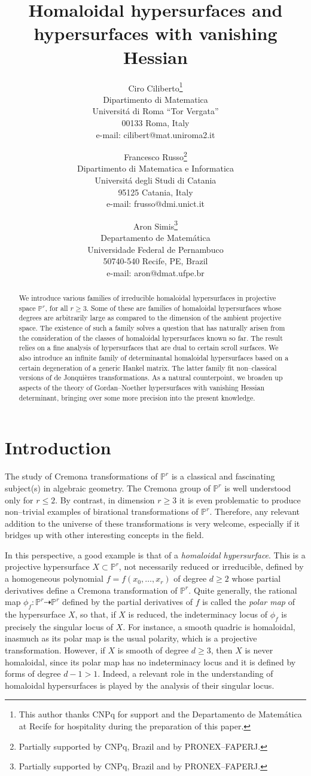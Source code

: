 \documentclass[11pt]{article}   %
\title{\LARGE\sc  Homaloidal hypersurfaces and hypersurfaces with vanishing
Hessian}
\author{
{\normalsize\sc Ciro Ciliberto\thanks{This author thanks CNPq for support and the
Departamento de Matem\'atica at Recife for hospitality during the
preparation of this paper.}}
\vspace{-0.75mm}\\
{\small Dipartimento di Matematica}\vspace{-1.4mm} \\
{\small Universit\'a di Roma ``Tor Vergata''}\vspace{-1.4mm}\\
{\small 00133 Roma, Italy}\vspace{-1.4mm} \\
{\small e-mail: {cilibert@mat.uniroma2.it}} \\
\and {\normalsize\sc Francesco Russo\thanks{Partially
 supported by CNPq, Brazil and by PRONEX--FAPERJ.}}
\vspace{-0.75mm}\\
{\small Dipartimento di Matematica e Informatica}\vspace{-1.4mm} \\
{\small Universit\'a degli Studi di Catania}\vspace{-1.4mm}\\
{\small 95125 Catania, Italy}\vspace{-1.4mm} \\
{\small e-mail: {frusso@dmi.unict.it}}\\
 \and {\normalsize\sc Aron Simis\thanks {Partially supported by CNPq, Brazil and by PRONEX--FAPERJ.}}
\vspace{-0.75mm}\\
{\small Departamento de Matem\'atica}\vspace{-1.4mm} \\
{\small Universidade Federal de Pernambuco}\vspace{-1.4mm}\\
{\small 50740-540 Recife, PE, Brazil}\vspace{-1.4mm} \\
{\small e-mail: {aron@dmat.ufpe.br}} }
\theoremstyle{definition}
\numberwithin{Theorem}{section} \numberwithin{equation}{section}
\newcommand{\p}{{\mathbb P}}
\begin{document}
\date{}
\maketitle


\begin{abstract}

We {introduce} various families of
irreducible homaloidal hypersurfaces in projective space $\p^ r$,
for all $r\geq 3$. Some of these are families of homaloidal
hypersurfaces whose degrees are arbitrarily large as compared to the
dimension of the ambient projective space. The existence of such a
family solves a question that has naturally arisen from the
consideration of the classes of homaloidal hypersurfaces known so
far. The result relies on a fine analysis
of hypersurfaces {that are dual} to certain scroll
surfaces. We also introduce an infinite family of determinantal
homaloidal hypersurfaces based   on a
certain degeneration of a generic Hankel matrix. {The latter
family} fit non--classical versions of de
Jonqui\`eres transformations. As a natural counterpoint, we broaden
up aspects of the theory of Gordan--Noether hypersurfaces with
vanishing Hessian determinant, bringing
over some more precision into the present knowledge.


\end{abstract}


\section*{Introduction}\label {intro}

The study of Cremona  transformations of
$\p^ r$ is {a}  classical and fascinating
subject(s) in algebraic geometry. The Cremona group of $\p^ r$ is
well understood only for $r\leq 2$. By contrast, in dimension $r\geq
3$ it is even problematic to produce non--trivial examples of
birational transformations of $\p^ r$.
Therefore, {any relevant addition to the universe of these
transformations} is very welcome, especially if it bridges {up}
with other interesting concepts in the field.

In this perspective, {a good example}
 is {that of a}
\emph{homaloidal hypersurface}. This is a projective hypersurface
$X\subset \p^r$, not necessarily reduced or irreducible,
defined by a homogeneous {polynomial
$f=f(x_0,\dots,x_r)$ of degree ${d\geq 2}$ whose}
partial derivatives define a Cremona
transformation of $\p^r$. {Quite
generally}, the rational map
$\phi_f:\p^r\dasharrow \p^r$ defined by the partial derivatives of
$f$ is called the \emph {polar map}  of the hypersurface $X$, so
that, if  $X$ is reduced, the indeterminacy locus of $\phi_f$ is
precisely the singular locus of $X$. For instance,  a smooth quadric
is homaloidal, inasmuch as its polar map is the usual polarity,
which is a projective transformation. However, if $X$ is smooth of
degree $d\geq 3$, then $X$ is never homaloidal, since its polar map
has no indeterminacy locus and it is defined by forms of degree
$d-1>1$.  Indeed, a
relevant role in the understanding of homaloidal hypersurfaces is
played by the analysis of their singular locus.
\end{document}

